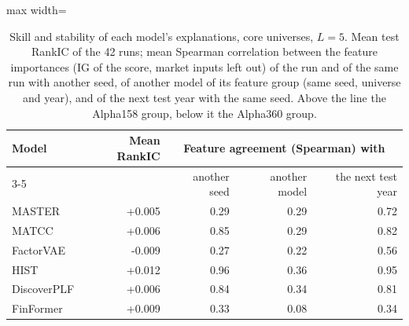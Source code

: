 \begin{table}[htbp]
\centering
\small
\begin{adjustbox}{max width=\textwidth}
\begin{tabular}{@{}lrrrr@{}}
\toprule
\textbf{Model} & \textbf{Mean RankIC} & \multicolumn{3}{c}{\textbf{Feature agreement (Spearman) with}} \\
\cmidrule(lr){3-5}
 & & another seed & another model & the next test year \\
\midrule
MASTER & +0.005 & 0.29 & 0.29 & 0.72 \\
MATCC & +0.006 & 0.85 & 0.29 & 0.82 \\
FactorVAE & -0.009 & 0.27 & 0.22 & 0.56 \\
\midrule
HIST & +0.012 & 0.96 & 0.36 & 0.95 \\
DiscoverPLF & +0.006 & 0.84 & 0.34 & 0.81 \\
FinFormer & +0.009 & 0.33 & 0.08 & 0.34 \\
\bottomrule
\end{tabular}
\end{adjustbox}
\caption{Skill and stability of each model's explanations, core universes, $L = 5$. Mean test RankIC of the 42 runs; mean Spearman correlation between the feature importances (IG of the score, market inputs left out) of the run and of the same run with another seed, of another model of its feature group (same seed, universe and year), and of the next test year with the same seed. Above the line the Alpha158 group, below it the Alpha360 group.}
\label{tab:res_agreement_models}
\end{table}
